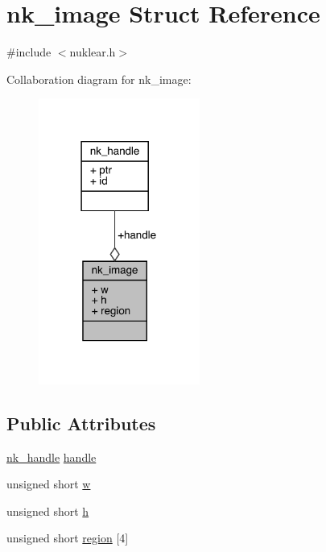 \hypertarget{structnk__image}{}\section{nk\+\_\+image Struct Reference}
\label{structnk__image}


{\ttfamily \#include $<$nuklear.\+h$>$}



Collaboration diagram for nk\+\_\+image\+:
\nopagebreak
\begin{figure}[H]
\begin{center}
\leavevmode
\includegraphics[width=150pt]{structnk__image__coll__graph}
\end{center}
\end{figure}
\subsection*{Public Attributes}
\begin{DoxyCompactItemize}
\item 
\mbox{\hyperlink{unionnk__handle}{nk\+\_\+handle}} \mbox{\hyperlink{structnk__image_ac8489fd68c4b2228eecdd017353ccf40}{handle}}
\item 
unsigned short \mbox{\hyperlink{structnk__image_aa860d11829d4baf42e0fb5d2f8e7b9af}{w}}
\item 
unsigned short \mbox{\hyperlink{structnk__image_a5d738d1061d5b9ffa1588e4d320bc3c5}{h}}
\item 
unsigned short \mbox{\hyperlink{structnk__image_a0558f88dc25def97650d525d65429674}{region}} \mbox{[}4\mbox{]}
\end{DoxyCompactItemize}


